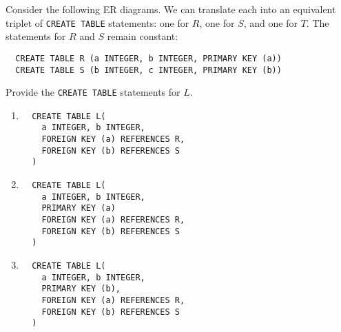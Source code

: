 \documentclass{article}
\begin{document}
Consider the following ER diagrams. We can translate each into an equivalent
triplet of \texttt{CREATE TABLE} statements: one for $R$, one for $S$, and one
for $T$. The statements for $R$ and $S$ remain constant:
\begin{verbatim}
  CREATE TABLE R (a INTEGER, b INTEGER, PRIMARY KEY (a))
  CREATE TABLE S (b INTEGER, c INTEGER, PRIMARY KEY (b))
\end{verbatim}
Provide the \texttt{CREATE TABLE} statements for $L$.
\begin{multicols}{2}
\begin{enumerate}
  \item \hfill

{
\iftoggle{showsolutions}{\color{red}}{\color{white}}
\begin{verbatim}
  CREATE TABLE L(
    a INTEGER, b INTEGER,
    FOREIGN KEY (a) REFERENCES R,
    FOREIGN KEY (b) REFERENCES S
  )
\end{verbatim}
}

  \item \hfill

{
\iftoggle{showsolutions}{\color{red}}{\color{white}}
\begin{verbatim}
  CREATE TABLE L(
    a INTEGER, b INTEGER,
    PRIMARY KEY (a)
    FOREIGN KEY (a) REFERENCES R,
    FOREIGN KEY (b) REFERENCES S
  )
\end{verbatim}
}

  \item \hfill

{
\iftoggle{showsolutions}{\color{red}}{\color{white}}
\begin{verbatim}
  CREATE TABLE L(
    a INTEGER, b INTEGER,
    PRIMARY KEY (b),
    FOREIGN KEY (a) REFERENCES R,
    FOREIGN KEY (b) REFERENCES S
  )
\end{verbatim}
}

\vspace{4cm}\phantom{a}
\end{enumerate}
\end{multicols}
\end{document}
